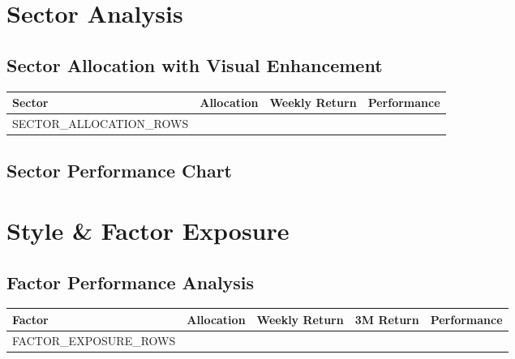 \documentclass[11pt]{article}
\renewcommand{\arraystretch}{1.3}
\begin{document}
\section{Sector Analysis}

\subsection{Sector Allocation with Visual Enhancement}

\renewcommand{\arraystretch}{1.3}

\begin{tabularx}{\textwidth}{|X|>{\raggedleft\arraybackslash}c|>{\raggedleft\arraybackslash}c|>{\raggedleft\arraybackslash}c|}
\hline
\rowcolor{primary!15}
\textbf{Sector} & \textbf{Allocation} & \textbf{Weekly Return} & \textbf{Performance} \\
\hline
{{SECTOR_ALLOCATION_ROWS}}
\hline
\end{tabularx}

\subsection{Sector Performance Chart}

\begin{center}
\end{center}

\section{Style \& Factor Exposure}

\subsection{Factor Performance Analysis}

\renewcommand{\arraystretch}{1.3}
\begin{tabularx}{\textwidth}{|X|>{\raggedleft\arraybackslash}c|>{\raggedleft\arraybackslash}c|>{\raggedleft\arraybackslash}c|>{\raggedleft\arraybackslash}c|}
\hline
\rowcolor{secondary!15}
\textbf{Factor} & \textbf{Allocation} & \textbf{Weekly Return} & \textbf{3M Return} & \textbf{Performance} \\
\hline
{{FACTOR_EXPOSURE_ROWS}}
\hline
\end{tabularx}
\end{document}
